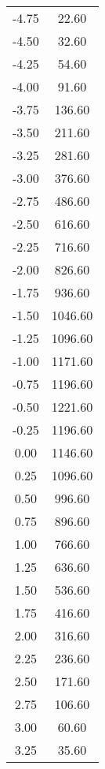 \begin{longtable}{S[table-format=3.2] S[table-format=3.2]}
                        -4.75 & 22.60\\
                        -4.50 & 32.60\\
                        -4.25 & 54.60\\
                        -4.00 & 91.60\\
                        -3.75 & 136.60\\
                        -3.50 & 211.60\\
                        -3.25 & 281.60\\
                        -3.00 & 376.60\\
                        -2.75 & 486.60\\
                        -2.50 & 616.60\\
                        -2.25 & 716.60\\
                        -2.00 & 826.60\\
                        -1.75 & 936.60\\
                        -1.50 & 1046.60\\
                        -1.25 & 1096.60\\
                        -1.00 & 1171.60\\
                        -0.75 & 1196.60\\
                        -0.50 & 1221.60\\
                        -0.25 & 1196.60\\
                        0.00 & 1146.60\\
                        0.25 & 1096.60\\
                        0.50 & 996.60\\
                        0.75 & 896.60\\
                        1.00 & 766.60\\
                        1.25 & 636.60\\
                        1.50 & 536.60\\
                        1.75 & 416.60\\
                        2.00 & 316.60\\
                        2.25 & 236.60\\
                        2.50 & 171.60\\
                        2.75 & 106.60\\
                        3.00 & 60.60\\
                        3.25 & 35.60\\

\end{longtable}
